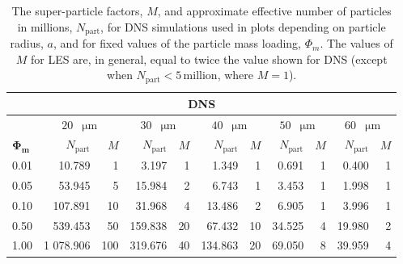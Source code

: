\documentclass{pracamgren}
\begin{document}
\begin{table}[ht]
\centering
\scriptsize
\begin{tabular}{l|rr|rr|rr|rr|rr}
\multicolumn{11}{c}{\textbf{DNS}} \\ \hline
& \multicolumn{2}{c|}{$20$~$\upmu\text{m}$} & \multicolumn{2}{c|}{$30$~$\upmu\text{m}$} & \multicolumn{2}{c|}{$40$~$\upmu\text{m}$} & \multicolumn{2}{c|}{$50$~$\upmu\text{m}$} & \multicolumn{2}{c}{$60$~$\upmu\text{m}$} \\
$\mathbf{\Phi_m}$ & $N_{\text{part}}$ & $M$ & $N_{\text{part}}$ & $M$ & $N_{\text{part}}$ & $M$ & $N_{\text{part}}$ & $M$ & $N_{\text{part}}$ & $M$ \\ \hline
0.01 & 10.789 & 1 & 3.197 & 1 & 1.349 & 1 & 0.691 & 1 & 0.400 & 1 \\ 
0.05 & 53.945 & 5 & 15.984 & 2 & 6.743 & 1 & 3.453 & 1 & 1.998 & 1 \\ 
0.10 & 107.891 & 10 & 31.968 & 4 & 13.486 & 2 & 6.905 & 1 & 3.996 & 1 \\ 
0.50 & 539.453 & 50 & 159.838 & 20 & 67.432 & 10 & 34.525 & 4 & 19.980 & 2 \\  
1.00 & 1 078.906 & 100 & 319.676 & 40 & 134.863 & 20 & 69.050 & 8 & 39.959 & 4 \\ \hline 
\end{tabular}
\caption{The super-particle factors, $M$, and approximate effective number of particles in millions, $N_{\text{part}}$, for DNS simulations used in plots depending on particle radius, $a$, and for fixed values of the particle mass loading, $\Phi_m$.
The values of $M$ for LES are, in general, equal to twice the value shown for DNS (except when $N_{\text{part}} < 5 \, \text{million}$, where $M=1$).
}
\label{tab:spp-phic}
\end{table}
\end{document}
